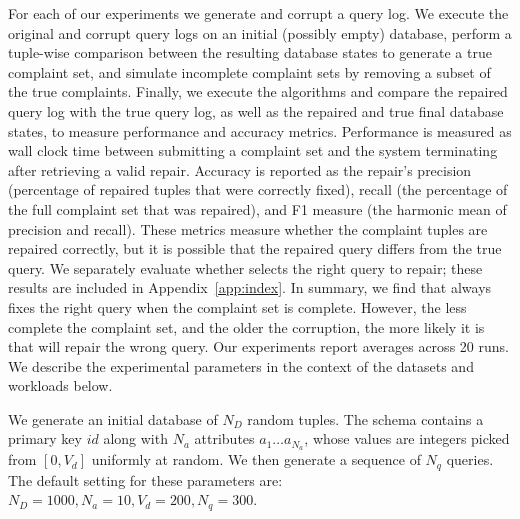 For each of our experiments we generate and corrupt a query log. 
We execute the original and corrupt query logs on an initial (possibly empty) database,
perform a tuple-wise comparison between the resulting database states to generate a true complaint set,
and simulate incomplete complaint sets by removing a subset of the true complaints.
Finally, we execute the algorithms and compare the repaired query log with the true query log, as well as the repaired and true
final database states, to measure performance and accuracy metrics.
Performance is measured as wall clock
time between submitting a complaint set and the system terminating after retrieving a valid repair.  
Accuracy is reported as the repair's precision (percentage of repaired tuples that were correctly fixed), 
recall (the percentage of the full complaint set that was repaired), 
and F1 measure (the harmonic mean of precision and recall). 
These metrics measure whether the complaint tuples are repaired correctly, but it is possible that the repaired query differs from the true query. 
We separately evaluate whether \sys selects the right query to repair; these results are included in Appendix~\ref{app:index}.  In summary, we find that \sys always fixes the right query when the complaint set is complete.  However, the less complete the complaint set, and the older the corruption, the more likely it is that \sys will repair the wrong query.
Our experiments report averages across 20 runs.
We describe the experimental parameters in the context of the datasets and workloads below. 




 \label{sec:syntheticgen}
We generate an initial database of $N_D$ random tuples.  
The schema contains a primary key $id$ along with $N_a$ attributes $a_1\ldots a_{N_a}$, whose values are integers picked from $[0, V_d]$ uniformly at random.
We then generate a sequence of $N_q$ queries. 
The default setting for these parameters are: $N_D = 1000, N_a = 10, V_d = 200, N_q = 300$. 


